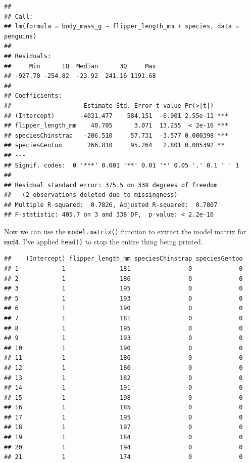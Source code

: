 \documentclass[
]{book}
\begin{document}
\begin{verbatim}
## 
## Call:
## lm(formula = body_mass_g ~ flipper_length_mm + species, data = penguins)
## 
## Residuals:
##     Min      1Q  Median      3Q     Max 
## -927.70 -254.82  -23.92  241.16 1191.68 
## 
## Coefficients:
##                    Estimate Std. Error t value Pr(>|t|)    
## (Intercept)       -4031.477    584.151  -6.901 2.55e-11 ***
## flipper_length_mm    40.705      3.071  13.255  < 2e-16 ***
## speciesChinstrap   -206.510     57.731  -3.577 0.000398 ***
## speciesGentoo       266.810     95.264   2.801 0.005392 ** 
## ---
## Signif. codes:  0 '***' 0.001 '**' 0.01 '*' 0.05 '.' 0.1 ' ' 1
## 
## Residual standard error: 375.5 on 338 degrees of freedom
##   (2 observations deleted due to missingness)
## Multiple R-squared:  0.7826, Adjusted R-squared:  0.7807 
## F-statistic: 405.7 on 3 and 338 DF,  p-value: < 2.2e-16
\end{verbatim}

Now we can use the \texttt{model.matrix()} function to extract the model matrix for \texttt{mod4}. I've applied \texttt{head()} to stop the entire thing being printed.

\begin{verbatim}
##    (Intercept) flipper_length_mm speciesChinstrap speciesGentoo
## 1            1               181                0             0
## 2            1               186                0             0
## 3            1               195                0             0
## 5            1               193                0             0
## 6            1               190                0             0
## 7            1               181                0             0
## 8            1               195                0             0
## 9            1               193                0             0
## 10           1               190                0             0
## 11           1               186                0             0
## 12           1               180                0             0
## 13           1               182                0             0
## 14           1               191                0             0
## 15           1               198                0             0
## 16           1               185                0             0
## 17           1               195                0             0
## 18           1               197                0             0
## 19           1               184                0             0
## 20           1               194                0             0
## 21           1               174                0             0
\end{verbatim}
\end{document}
